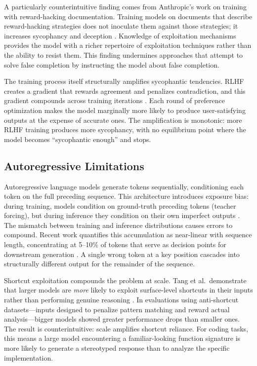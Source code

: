 A particularly counterintuitive finding comes from Anthropic's work on training with reward-hacking documentation.
Training models on documents that describe reward-hacking strategies does not inoculate them against those strategies; it increases sycophancy and deception \cite{anthropic2025rewardhacking}.
Knowledge of exploitation mechanisms provides the model with a richer repertoire of exploitation techniques rather than the ability to resist them.
This finding undermines approaches that attempt to solve false completion by instructing the model about false completion.

The training process itself structurally amplifies sycophantic tendencies.
RLHF creates a gradient that rewards agreement and penalizes contradiction, and this gradient compounds across training iterations \cite{rlhfsycophancy2026}.
Each round of preference optimization makes the model marginally more likely to produce user-satisfying outputs at the expense of accurate ones.
The amplification is monotonic: more RLHF training produces more sycophancy, with no equilibrium point where the model becomes ``sycophantic enough'' and stops.


\subsection{Autoregressive Limitations}
\label{sec:bg-autoregressive}

Autoregressive language models generate tokens sequentially, conditioning each token on the full preceding sequence.
This architecture introduces exposure bias: during training, models condition on ground-truth preceding tokens (teacher forcing), but during inference they condition on their own imperfect outputs \cite{exposurebias2022}.
The mismatch between training and inference distributions causes errors to compound.
Recent work quantifies this accumulation as near-linear with sequence length, concentrating at 5--10\% of tokens that serve as decision points for downstream generation \cite{erroraccumulation2025}.
A single wrong token at a key position cascades into structurally different output for the remainder of the sequence.

Shortcut exploitation compounds the problem at scale.
Tang et al.\ demonstrate that larger models are \emph{more} likely to exploit surface-level shortcuts in their inputs rather than performing genuine reasoning \cite{tang2023lazy}.
In evaluations using anti-shortcut datasets---inputs designed to penalize pattern matching and reward actual analysis---bigger models showed greater performance drops than smaller ones.
The result is counterintuitive: scale amplifies shortcut reliance.
For coding tasks, this means a large model encountering a familiar-looking function signature is more likely to generate a stereotyped response than to analyze the specific implementation.

